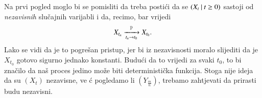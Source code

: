 \begin{nap} \label{nap:21.2}
    Na prvi pogled moglo bi se pomisliti da treba posti\' ci da se $({X_t} \: | \: {t \geq 0})$ sastoji od \emph{nezavisnih} slu\v cajnih varijabli i da, recimo, bar vrijedi
    \begin{equation*}
        X_{t_n} \xrightarrow[t_n \to t_0]{\mathbb{P}} X_{t_0}.
    \end{equation*}
    Lako se vidi da je to pogre\v san pristup, jer bi iz nezavisnosti moralo slijediti da je $X_{t_0}$ gotovo sigurno jednako konstanti.
    Budu\' ci da to vrijedi za svaki $t_0$, to bi zna\v cilo da na\v s proces jedino mo\v ze biti deterministi\v cka funkcija.
    Stoga nije ideja da su $(X_t)$ nezavisne, ve \' c pogledamo li $(Y_{\frac{m}{n}})$, trebamo zahtjevati da prirasti budu nezavisni.
\end{nap}

